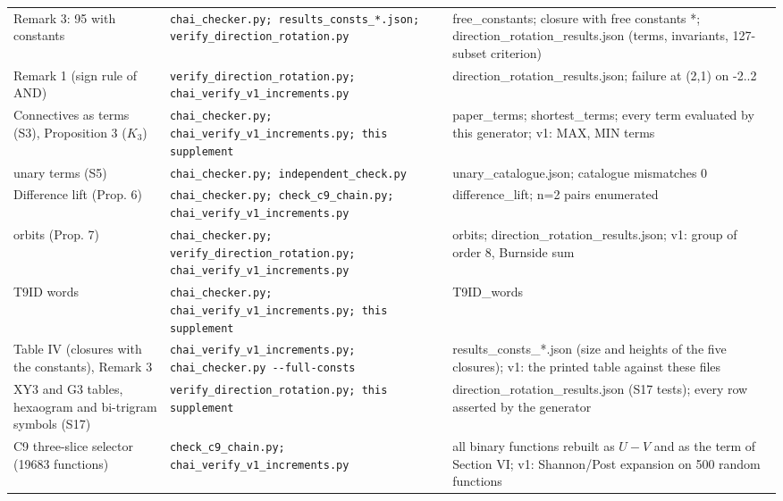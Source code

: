 \documentclass[10pt,a4paper]{article}
\begin{document}
\begin{center}
\begin{longtable}{>{\raggedright\arraybackslash}p{4.6cm}>{\raggedright\arraybackslash}p{5.2cm}>{\raggedright\arraybackslash}p{6.2cm}}
Remark 3: 95 with constants&\texttt{chai\_checker.py; \allowbreak results\_consts\_*.json; \allowbreak verify\_direction\_rotation.py}&free\_constants; closure with free constants *; direction\_rotation\_results.json (terms, invariants, 127-subset criterion)\\
Remark 1 (sign rule of AND)&\texttt{verify\_direction\_rotation.py; \allowbreak chai\_verify\_v1\_increments.py}&direction\_rotation\_results.json; failure at (2,1) on {-2..2}\\
Connectives as terms (S3), Proposition 3 ($K_3$)&\texttt{chai\_checker.py; \allowbreak chai\_verify\_v1\_increments.py; \allowbreak this supplement}&paper\_terms; shortest\_terms; every term evaluated by this generator; v1: MAX, MIN terms\\
27 unary terms (S5)&\texttt{chai\_checker.py; \allowbreak independent\_check.py}&unary\_catalogue.json; catalogue mismatches 0\\
Difference lift (Prop. 6)&\texttt{chai\_checker.py; \allowbreak check\_c9\_chain.py; \allowbreak chai\_verify\_v1\_increments.py}&difference\_lift; n=2 pairs enumerated\\
2862 orbits (Prop. 7)&\texttt{chai\_checker.py; \allowbreak verify\_direction\_rotation.py; \allowbreak chai\_verify\_v1\_increments.py}&orbits; direction\_rotation\_results.json; v1: group of order 8, Burnside sum\\
T9ID words&\texttt{chai\_checker.py; \allowbreak chai\_verify\_v1\_increments.py; \allowbreak this supplement}&T9ID\_words\\
Table IV (closures with the constants), Remark 3&\texttt{chai\_verify\_v1\_increments.py; \allowbreak chai\_checker.py -{}-full-consts}&results\_consts\_*.json (size and heights of the five closures); v1: the printed table against these files\\
XY3 and G3 tables, hexaogram and bi-trigram symbols (S17)&\texttt{verify\_direction\_rotation.py; \allowbreak this supplement}&direction\_rotation\_results.json (S17 tests); every row asserted by the generator\\
C9 three-slice selector (19683 functions)&\texttt{check\_c9\_chain.py; \allowbreak chai\_verify\_v1\_increments.py}&all binary functions rebuilt as $U-V$ and as the term of Section VI; v1: Shannon/Post expansion on 500 random functions\\
\bottomrule\end{longtable}\end{center}
\end{document}
